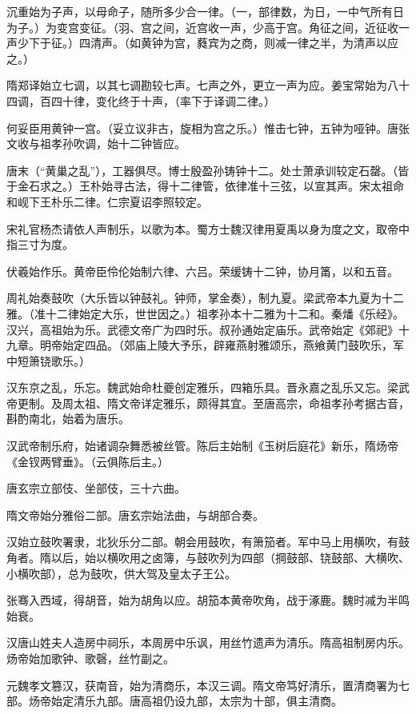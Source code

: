 \documentclass[a4paper,12pt,UTF8,twoside]{ctexbook}
\begin{document}
    沉重始为子声，以母命子，随所多少合一律。（一，部律数，为日，一中气所有日为子。）为变宫变征。（羽、宫之间，近宫收一声，少高于宫。角征之间，近征收一声少下于征。）四清声。（如黄钟为宫，蕤宾为之商，则减一律之半，为清声以应之。）
    
    隋郑译始立七调，以其七调勘较七声。七声之外，更立一声为应。姜宝常始为八十四调，百四十律，变化终于十声，（率下于译调二律。）
    
    何妥臣用黄钟一宫。（妥立议非古，旋相为宫之乐。）惟击七钟，五钟为哑钟。唐张文收与祖孝孙吹调，始十二钟皆应。
    
    唐末（“黄巢之乱”），工器俱尽。博士殷盈孙铸钟十二。处士萧承训较定石罄。（皆于金石求之。）王朴始寻古法，得十二律管，依律准十三弦，以宣其声。宋太祖命和岘下王朴乐二律。仁宗夏诏李照较定。
    
    宋礼官杨杰请依人声制乐，以歌为本。蜀方士魏汉律用夏禹以身为度之文，取帝中指三寸为度。
    
    伏羲始作乐。黄帝臣伶伦始制六律、六吕。荣缓铸十二钟，协月筩，以和五音。
    
    周礼始奏鼓吹（大乐皆以钟鼓礼。钟师，掌金奏），制九夏。梁武帝本九夏为十二雅。（准十二律始定大乐，世世因之。）祖孝孙本十二雅为十二和。秦燔《乐经》。汉兴，高祖始为乐。武德文帝广为四时乐。叔孙通始定庙乐。武帝始定《郊祀》十九章。明帝始定四品。（郊庙上陵大予乐，辟雍燕射雅颂乐，燕飨黄门鼓吹乐，军中短箫铙歌乐。）
    
    汉东京之乱，乐忘。魏武始命杜夔创定雅乐，四箱乐具。晋永嘉之乱乐又忘。梁武帝更制。及周太祖、隋文帝详定雅乐，颇得其宜。至唐高宗，命祖孝孙考据古音，斟酌南北，始着为唐乐。
    
    汉武帝制乐府，始诸调杂舞悉被丝管。陈后主始制《玉树后庭花》新乐，隋炀帝《金钗两臂垂》。（云俱陈后主。）
    
    唐玄宗立部伎、坐部伎，三十六曲。
    
    隋文帝始分雅俗二部。唐玄宗始法曲，与胡部合奏。
    
    汉始立鼓吹署隶，北狄乐分二部。朝会用鼓吹，有箫笳者。军中马上用横吹，有鼓角者。隋以后，始以横吹用之卤簿，与鼓吹列为四部（掆鼓部、铙鼓部、大横吹、小横吹部），总为鼓吹，供大驾及皇太子王公。
    
    张骞入西域，得胡音，始为胡角以应。胡笳本黄帝吹角，战于涿鹿。魏时减为半鸣始衰。
    
    汉唐山姓夫人造房中祠乐，本周房中乐讽，用丝竹遗声为清乐。隋高祖制房内乐。炀帝始加歌钟、歌磬，丝竹副之。
    
    元魏孝文篡汉，获南音，始为清商乐，本汉三调。隋文帝笃好清乐，置清商署为七部。炀帝始定清乐九部。唐高祖仍设九部，太宗为十部，俱主清商。
    
\end{document}

